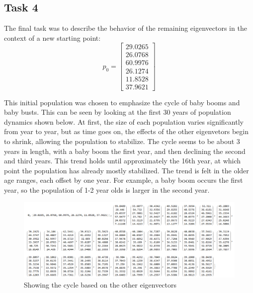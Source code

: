 \documentclass[12pt]{extarticle}
\begin{document}
\subsection{Task 4}
The final task was to describe the behavior of the remaining eigenvectors in the context of a new starting point:
\[p_0 = \begin{bmatrix}
29.0265\\26.0768\\60.9976\\26.1274\\11.8528\\37.9621
\end{bmatrix}\]

This initial population was chosen to emphasize the cycle of baby booms and baby busts. This can be seen by looking at the first 30 years of population dynamics shown below. At first, the size of each population varies significantly from year to year, but as time goes on, the effects of the other eigenvetors begin to shrink, allowing the population to stabilize. The cycle seems to be about 3 years in length, with a baby boom the first year, and then declining the second and third years. This trend holds until approximately the 16th year, at which point the population has already mostly stabilized. The trend is felt in the older age ranges, each offset by one year. For example, a baby boom occurs the first year, so the population of 1-2 year olds is larger in the second year. 

\begin{figure}[ht!]
  \includegraphics[width=\linewidth]{NewStartingPopulation.PNG}
  \caption{Showing the cycle based on the other eigenvectors}
\end{figure}
\end{document}
